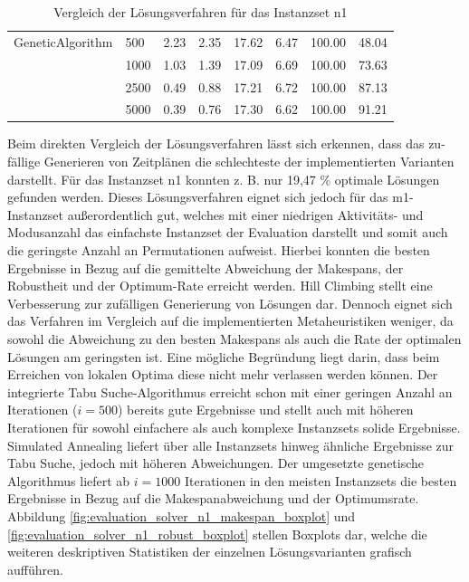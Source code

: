 \begin{table}[H]
{\begin{tabular}{ll|rr|rr|rr}
GeneticAlgorithm & 500  &     2.23 & 2.35 &      17.62 & 6.47 &   100.00 &   48.04 \\
                 & 1000 &     1.03 & 1.39 &      17.09 & 6.69 &   100.00 &   73.63 \\
                 & 2500 &     0.49 & 0.88 &      17.21 & 6.72 &   100.00 &   87.13 \\
                 & 5000 &     0.39 & 0.76 &      17.30 & 6.62 &   100.00 &   91.21 \\
\bottomrule
\end{tabular}
}
\caption{Vergleich der Lösungsverfahren für das Instanzset n1}
\label{tab:evaluation_solver_n1}
\end{table}

Beim direkten Vergleich der Lösungsverfahren lässt sich erkennen, dass das zu-fällige Generieren von Zeitplänen die schlechteste der implementierten Varianten darstellt. Für das Instanzset n1 konnten z. B. nur 19,47 \% optimale Lösungen gefunden werden. Dieses Lösungsverfahren eignet sich jedoch für das m1-Instanzset außerordentlich gut, welches mit einer niedrigen Aktivitäts- und Modusanzahl das einfachste Instanzset der Evaluation darstellt und somit auch die geringste Anzahl an Permutationen aufweist. Hierbei konnten die besten Ergebnisse in Bezug auf die gemittelte Abweichung der Makespans, der Robustheit und der Optimum-Rate erreicht werden. Hill Climbing stellt eine Verbesserung zur zufälligen Generierung von Lösungen dar. Dennoch eignet sich das Verfahren im Vergleich auf die implementierten Metaheuristiken weniger, da sowohl die Abweichung zu den besten Makespans als auch die Rate der optimalen Lösungen am geringsten ist. Eine mögliche Begründung liegt darin, dass beim Erreichen von lokalen Optima diese nicht mehr verlassen werden können. Der integrierte Tabu Suche-Algorithmus erreicht schon mit einer geringen Anzahl an Iterationen ($i = 500$) bereits gute Ergebnisse und stellt auch mit höheren Iterationen für sowohl einfachere als auch komplexe Instanzsets solide Ergebnisse. Simulated Annealing liefert über alle Instanzsets hinweg ähnliche Ergebnisse zur Tabu Suche, jedoch mit höheren Abweichungen. Der umgesetzte genetische Algorithmus liefert ab $i = 1 000$ Iterationen in den meisten Instanzsets die besten Ergebnisse in Bezug auf die Makespanabweichung und der Optimumsrate. Abbildung \ref{fig:evaluation_solver_n1_makespan_boxplot} und \ref{fig:evaluation_solver_n1_robust_boxplot} stellen Boxplots dar, welche die weiteren deskriptiven Statistiken der einzelnen Lösungsvarianten grafisch aufführen. 

